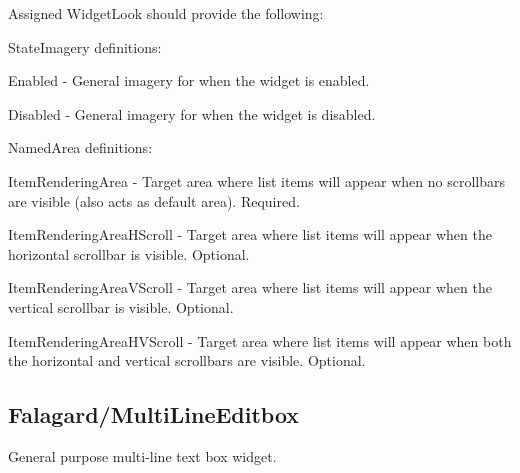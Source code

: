 Assigned Widget\+Look should provide the following\+: 
\begin{DoxyItemize}
\item State\+Imagery definitions\+: 
\begin{DoxyItemize}
\item Enabled -\/ General imagery for when the widget is enabled. 
\item Disabled -\/ General imagery for when the widget is disabled. 
\end{DoxyItemize}


\item Named\+Area definitions\+: 
\begin{DoxyItemize}
\item Item\+Rendering\+Area -\/ Target area where list items will appear when no scrollbars are visible (also acts as default area). Required. 
\item Item\+Rendering\+Area\+H\+Scroll -\/ Target area where list items will appear when the horizontal scrollbar is visible. Optional. 
\item Item\+Rendering\+Area\+V\+Scroll -\/ Target area where list items will appear when the vertical scrollbar is visible. Optional. 
\item Item\+Rendering\+Area\+H\+V\+Scroll -\/ Target area where list items will appear when both the horizontal and vertical scrollbars are visible. Optional. 
\end{DoxyItemize}
\end{DoxyItemize}\hypertarget{fal_wr_ref_fal_wr_ref_sec_13}{}\subsection{Falagard/\+Multi\+Line\+Editbox}\label{fal_wr_ref_fal_wr_ref_sec_13}
General purpose multi-\/line text box widget.

